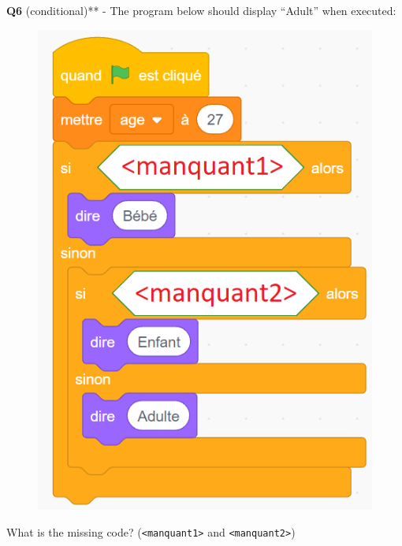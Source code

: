 \documentclass[14pt]{extarticle}
\begin{document}
\newpage
\textbf{Q6} (conditional)** - 
The program below should display “Adult” when executed:
\begin{figure}[H]
    \centering
    \includegraphics[width=0.55\linewidth]{images/pretest/_Q6.png}
\end{figure}
What is the missing code? (\texttt{<manquant1>} and \texttt{<manquant2>})
\end{document}
